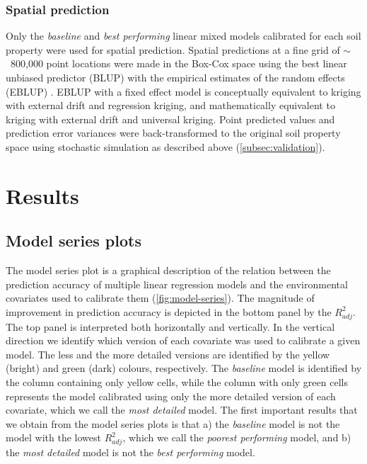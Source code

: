 \subsubsection*{Spatial prediction}
\label{subsec:prediction}

Only the \textit{baseline} and \textit{best performing} linear mixed models calibrated for each soil property 
were used for spatial prediction. Spatial predictions at a fine grid of $\sim$~800,000 point locations were 
made in the Box-Cox space using the best linear unbiased predictor (BLUP) with the empirical estimates of the 
random effects (EBLUP) \cite{LarkEtAl2006}. EBLUP with a fixed effect model is conceptually equivalent to 
kriging with external drift and regression kriging, and mathematically equivalent to kriging with external 
drift and universal kriging. Point predicted values and prediction error variances were back-transformed to the 
original soil property space using stochastic simulation as described above (\autoref{subsec:validation}).

\section{Results}
\label{sec:results}

\subsection{Model series plots}

The model series plot is a graphical description of the relation between the prediction accuracy of multiple 
linear regression models and the environmental covariates used to calibrate them (\autoref{fig:model-series}). 
The magnitude of improvement in prediction accuracy is depicted in the bottom panel by the ${R}^{2}_{adj}$. The 
top panel is interpreted both horizontally and vertically. In the vertical direction we identify which version 
of each covariate was used to calibrate a given model. The less and the more detailed versions are identified 
by the yellow (bright) and green (dark) colours, respectively. The \textit{baseline} model is identified by the 
column containing only yellow cells, while the column with only green cells represents the model calibrated 
using only the more detailed version of each covariate, which we call the \textit{most detailed} model. The 
first important results that we obtain from the model series plots is that a) the \textit{baseline} model is 
not the model with the lowest ${R}^{2}_{adj}$, which we call the \textit{poorest performing} model, and b) the 
\textit{most detailed} model is not the \textit{best performing} model.

